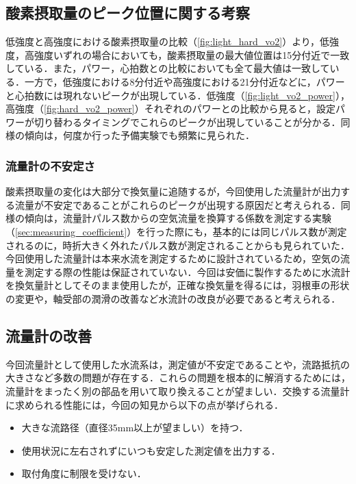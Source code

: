 \subsection{酸素摂取量のピーク位置に関する考察}

低強度と高強度における酸素摂取量の比較（\ref{fig:light_hard_vo2}）より，低強度，高強度いずれの場合においても，酸素摂取量の最大値位置は15分付近で一致している．また，パワー，心拍数との比較においても全て最大値は一致している．一方で，低強度における8分付近や高強度における21分付近などに，パワーと心拍数には現れないピークが出現している．低強度（\ref{fig:light_vo2_power}），高強度（\ref{fig:hard_vo2_power}）それぞれのパワーとの比較から見ると，設定パワーが切り替わるタイミングでこれらのピークが出現していることが分かる．同様の傾向は，何度か行った予備実験でも頻繁に見られた．

\subsubsection{流量計の不安定さ}

酸素摂取量の変化は大部分で換気量に追随するが，今回使用した流量計が出力する流量が不安定であることがこれらのピークが出現する原因だと考えられる．同様の傾向は，流量計パルス数からの空気流量を換算する係数を測定する実験（\ref{sec:measuring_coefficient}）を行った際にも，基本的には同じパルス数が測定されるのに，時折大きく外れたパルス数が測定されることからも見られていた．今回使用した流量計は本来水流を測定するために設計されているため，空気の流量を測定する際の性能は保証されていない．今回は安価に製作するために水流計を換気量計としてそのまま使用したが，正確な換気量を得るには，羽根車の形状の変更や，軸受部の潤滑の改善など水流計の改良が必要であると考えられる．

\subsection{流量計の改善}

今回流量計として使用した水流系は，測定値が不安定であることや，流路抵抗の大きさなど多数の問題が存在する．これらの問題を根本的に解消するためには，流量計をまったく別の部品を用いて取り換えることが望ましい．交換する流量計に求められる性能には，今回の知見から以下の点が挙げられる．

\begin{itemize}
  \item 大きな流路径（直径35mm以上が望ましい）を持つ．
  \item 使用状況に左右されずにいつも安定した測定値を出力する．
  \item 取付角度に制限を受けない．
\end{itemize}

